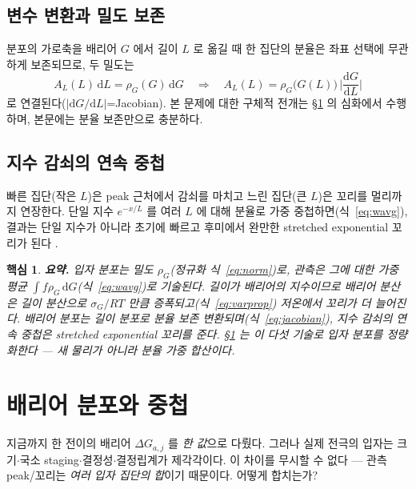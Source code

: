\documentclass[11pt,a4paper]{article}
\newtheorem*{keybox}{핵심}
\newcommand{\dd}{\mathrm{d}}
\begin{document}
\subsection{변수 변환과 밀도 보존}
분포의 가로축을 배리어 $G$ 에서 길이 $L$ 로 옮길 때 한 집단의 분율은 좌표 선택에 무관하게 보존되므로, 두 밀도는
\begin{equation}
A_L(L)\,\dd L=\rho_G(G)\,\dd G\quad\Longrightarrow\quad A_L(L)=\rho_G\big(G(L)\big)\,\Big|\frac{\dd G}{\dd L}\Big|
\label{eq:jacobian}
\end{equation}
로 연결된다($|\dd G/\dd L|$=Jacobian). 본 문제에 대한 구체적 전개는 \S\ref{sec:dist} 의 심화에서 수행하며,
본문에는 분율 보존만으로 충분하다.

\subsection{지수 감쇠의 연속 중첩}
빠른 집단(작은 $L$)은 peak 근처에서 감쇠를 마치고 느린 집단(큰 $L$)은 꼬리를 멀리까지 연장한다. 단일 지수 $e^{-x/L}$ 를 여러 $L$
에 대해 분율로 가중 중첩하면(식~\eqref{eq:wavg}), 결과는 단일 지수가 아니라 초기에 빠르고 후미에서 완만한
stretched exponential 꼬리가 된다 \cite{lindsey1980,johnston2006,svare2000}.

\begin{keybox}
\textbf{요약.} 입자 분포는 밀도 $\rho_G$(정규화 식~\eqref{eq:norm})로, 관측은 그에 대한 가중 평균
$\int f\rho_G\,\dd G$(식~\eqref{eq:wavg})로 기술된다. 길이가 배리어의 지수이므로 배리어 분산은 길이 분산으로
$\sigma_G/RT$ 만큼 증폭되고(식~\eqref{eq:varprop}) 저온에서 꼬리가 더 늘어진다. 배리어 분포는 길이 분포로 분율
보존 변환되며(식~\eqref{eq:jacobian}), 지수 감쇠의 연속 중첩은 stretched exponential 꼬리를 준다. \S\ref{sec:dist}
는 이 다섯 기술로 입자 분포를 정량화한다 — 새 물리가 아니라 분율 가중 합산이다.
\end{keybox}

\section{배리어 분포와 중첩}\label{sec:dist}
지금까지 한 전이의 배리어 $\Delta G_{a,j}$ 를 \emph{한 값}으로 다뤘다. 그러나 실제 전극의 입자는
크기$\cdot$국소 staging$\cdot$결정성$\cdot$결정립계가 제각각이다. 이 차이를 무시할 수 없다 — 관측 peak/꼬리는
\emph{여러 입자 집단의 합}이기 때문이다. 어떻게 합치는가?
\end{document}
